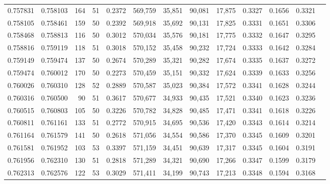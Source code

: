 \begin{tabular}{rrrrrrrrrrrrr}
0.757831 & 0.758103 &   164 &  51 &                                     0.2372 & 569,759 &  35,851 &  90,081 &  17,875 & 0.3327 & 0.1656 & 0.3321 \\
0.758105 & 0.758461 &   159 &  50 &                                     0.2392 & 569,918 &  35,692 &  90,131 &  17,825 & 0.3331 & 0.1651 & 0.3306 \\
0.758468 & 0.758813 &   116 &  50 &                                     0.3012 & 570,034 &  35,576 &  90,181 &  17,775 & 0.3332 & 0.1647 & 0.3295 \\
0.758816 & 0.759119 &   118 &  51 &                                     0.3018 & 570,152 &  35,458 &  90,232 &  17,724 & 0.3333 & 0.1642 & 0.3284 \\
0.759149 & 0.759474 &   137 &  50 &                                     0.2674 & 570,289 &  35,321 &  90,282 &  17,674 & 0.3335 & 0.1637 & 0.3272 \\
0.759474 & 0.760012 &   170 &  50 &                                     0.2273 & 570,459 &  35,151 &  90,332 &  17,624 & 0.3339 & 0.1633 & 0.3256 \\
0.760026 & 0.760310 &   128 &  52 &                                     0.2889 & 570,587 &  35,023 &  90,384 &  17,572 & 0.3341 & 0.1628 & 0.3244 \\
0.760316 & 0.760500 &    90 &  51 &                                     0.3617 & 570,677 &  34,933 &  90,435 &  17,521 & 0.3340 & 0.1623 & 0.3236 \\
0.760515 & 0.760803 &   105 &  50 &                                     0.3226 & 570,782 &  34,828 &  90,485 &  17,471 & 0.3341 & 0.1618 & 0.3226 \\
0.760811 & 0.761161 &   133 &  51 &                                     0.2772 & 570,915 &  34,695 &  90,536 &  17,420 & 0.3343 & 0.1614 & 0.3214 \\
0.761164 & 0.761579 &   141 &  50 &                                     0.2618 & 571,056 &  34,554 &  90,586 &  17,370 & 0.3345 & 0.1609 & 0.3201 \\
0.761581 & 0.761952 &   103 &  53 &                                     0.3397 & 571,159 &  34,451 &  90,639 &  17,317 & 0.3345 & 0.1604 & 0.3191 \\
0.761956 & 0.762310 &   130 &  51 &                                     0.2818 & 571,289 &  34,321 &  90,690 &  17,266 & 0.3347 & 0.1599 & 0.3179 \\
0.762313 & 0.762576 &   122 &  53 &                                     0.3029 & 571,411 &  34,199 &  90,743 &  17,213 & 0.3348 & 0.1594 & 0.3168 \\

\end{tabular}
